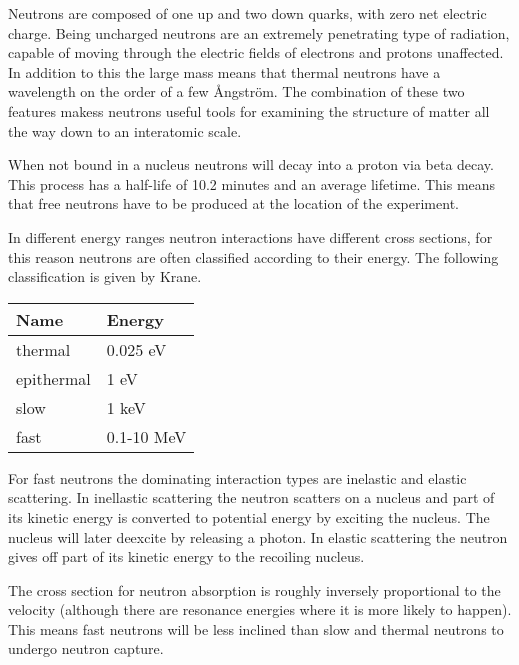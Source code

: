 \documentclass[main.tex]{subfiles}
\begin{document}
Neutrons are composed of one up and two down quarks, with zero net electric charge. Being uncharged neutrons are an extremely penetrating type of radiation, capable of moving through the electric fields of electrons and protons unaffected. In addition to this the large mass means that thermal neutrons have a wavelength on the order of a few Ångström. The combination of these two features makess neutrons useful tools for examining the structure of matter all the way down to an interatomic scale.

When not bound in a nucleus neutrons will decay into a proton via beta decay. This process has a half-life of 10.2 minutes \cite{Nudat} and an average lifetime. This means that free neutrons have to be produced at the location of the experiment.

In different energy ranges neutron interactions have different cross sections, for this reason neutrons are often classified according to their energy. The following classification is given by Krane\cite[444]{Krane}.

\begin{table}[h]
\center
\begin{tabular}{|l|l|}
\hline
\textbf{Name} & \textbf{Energy} \\ \hline
thermal       & 0.025 eV        \\ \hline
epithermal    & 1 eV            \\ \hline
slow          & 1 keV           \\ \hline
fast          & 0.1-10 MeV      \\ \hline
\end{tabular}
\label{tab:neutron}
\end{table}

For fast neutrons the dominating interaction types are inelastic and elastic scattering. In inellastic scattering the neutron scatters on a nucleus and part of its kinetic energy is converted to potential energy by exciting the nucleus. The nucleus will later deexcite by releasing a photon. In elastic scattering the neutron gives off part of its kinetic energy to the recoiling nucleus\cite[pg.63]{Leo}.

The cross section for neutron absorption is roughly inversely proportional to the velocity (although there are resonance energies where it is more likely to happen). This means fast neutrons will be less inclined than slow and thermal neutrons to undergo neutron capture. 
\end{document}
